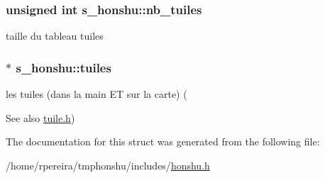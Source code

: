 \subsubsection[{\texorpdfstring{nb\+\_\+tuiles}{nb_tuiles}}]{\setlength{\rightskip}{0pt plus 5cm}unsigned int s\+\_\+honshu\+::nb\+\_\+tuiles}\hypertarget{structs__honshu_a44729b65a4628d7f765ab50469ed8dd4}{}\label{structs__honshu_a44729b65a4628d7f765ab50469ed8dd4}
taille du tableau \textquotesingle{}tuiles\textquotesingle{} 
\subsubsection[{\texorpdfstring{tuiles}{tuiles}}]{$\ast$ s\+\_\+honshu\+::tuiles}\hypertarget{structs__honshu_a4c362445c66116bf7fab7917489425fe}{}\label{structs__honshu_a4c362445c66116bf7fab7917489425fe}
les tuiles (dans la main ET sur la carte) (\begin{DoxySeeAlso}{See also}
\hyperlink{tuile_8h}{tuile.\+h}) 
\end{DoxySeeAlso}


The documentation for this struct was generated from the following file\+:\begin{DoxyCompactItemize}
\item 
/home/rpereira/tmphonshu/includes/\hyperlink{honshu_8h}{honshu.\+h}\end{DoxyCompactItemize}
